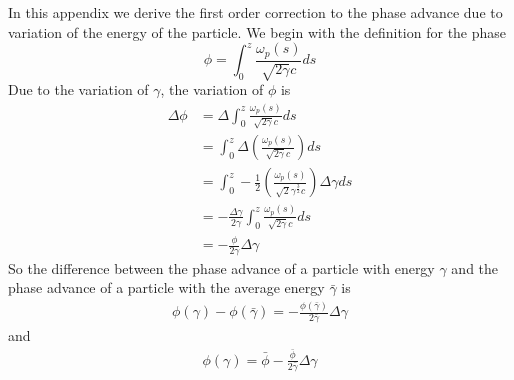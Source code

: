 \documentclass[%
reprint, superscriptaddress,
 amsmath,amssymb, aps,
prstab,
]{revtex4-2}
\begin{document}
\section{}
In this appendix we derive the first order correction to the phase advance due to variation of the energy of the particle. We begin with the definition for the phase
\[
\phi = \int_0^z \frac{\omega_p(s)}{\sqrt{2  \gamma}c} ds
\]
Due to the variation of $\gamma$, the variation of $\phi$ is
\begin{equation}
\begin{aligned}
\Delta \phi 
&= \Delta \int_0^z \frac{\omega_p(s)}{\sqrt{2  \gamma}c} ds
\\
& = \int_0^z \Delta(\frac{\omega_p(s)}{\sqrt{2  \gamma}c}) ds
\\
&= \int_0^z -\frac{1}{2}(\frac{\omega_p(s)}{\sqrt{2}\gamma^{\frac{3}{2}}c}) \Delta \gamma ds
\\
&= -\frac{\Delta \gamma}{2\gamma}\int_0^z \frac{\omega_p(s)}{\sqrt{2\gamma}c} ds
\\
&= -\frac{\phi}{2\gamma}\Delta \gamma
\end{aligned}
\end{equation}
So the difference between the phase advance of a particle with energy $\gamma$ and the phase advance of a particle with the average energy $\bar \gamma$ is
\begin{equation}
\begin{aligned}
\phi(\gamma) - \phi(\bar \gamma) = -\frac{\phi(\bar \gamma)}{2\bar \gamma} \Delta \gamma
\end{aligned}
\end{equation}
and
\begin{equation}
\begin{aligned}
\phi(\gamma) = \bar \phi -\frac{\bar \phi}{2\bar \gamma} \Delta \gamma
\end{aligned}
\end{equation}
\end{document}
